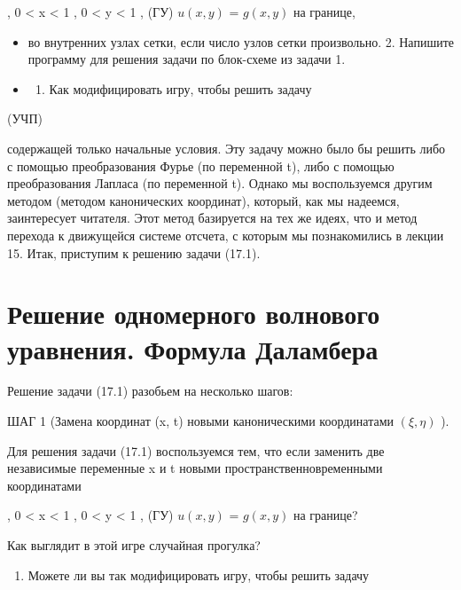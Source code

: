\documentclass[
  ukrainian,
]{article}
\providecommand{\tightlist}{%
  \setlength{\itemsep}{0pt}\setlength{\parskip}{0pt}}
\begin{document}
, 0 \textless{} x \textless{} 1 , 0 \textless{} y \textless{} 1 , (ГУ)
\(u(x, y)\) = \(g(x, y)\) на границе,

\begin{itemize}
\item
  во внутренних узлах сетки, если число узлов сетки произвольно. 2.
  Напишите программу для решения задачи по блок-схеме из задачи 1.
\item
  \begin{enumerate}
  \def\labelenumi{\arabic{enumi}.}
  \setcounter{enumi}{2}
  \tightlist
  \item
    Как модифицировать игру, чтобы решить задачу
  \end{enumerate}
\end{itemize}

(УЧП)

содержащей только начальные условия. Эту задачу можно было бы решить
либо с помощью преобразования Фурье (по переменной t), либо с помощью
преобразования Лапласа (по переменной t). Однако мы воспользуемся другим
методом (методом канонических координат), который, как мы надеемся,
заинтересует читателя. Этот метод базируется на тех же идеях, что и
метод перехода к движущейся системе отсчета, с которым мы познакомились
в лекции 15. Итак, приступим к решению задачи (17.1).

\section{Решение одномерного волнового уравнения. Формула
Даламбера}\label{ux440ux435ux448ux435ux43dux438ux435-ux43eux434ux43dux43eux43cux435ux440ux43dux43eux433ux43e-ux432ux43eux43bux43dux43eux432ux43eux433ux43e-ux443ux440ux430ux432ux43dux435ux43dux438ux44f.-ux444ux43eux440ux43cux443ux43bux430-ux434ux430ux43bux430ux43cux431ux435ux440ux430}

Решение задачи (17.1) разобьем на несколько шагов:

ШАГ 1 (Замена координат (x, t) новыми каноническими координатами
\((\xi, \eta)\) ).

Для решения задачи (17.1) воспользуемся тем, что если заменить две
независимые переменные x и t новыми пространственновременными
координатами

, 0 \textless{} x \textless{} 1 , 0 \textless{} y \textless{} 1 , (ГУ)
\(u(x, y)\) = \(g(x, y)\) на границе?

Как выглядит в этой игре случайная прогулка?

\begin{enumerate}
\def\labelenumi{\arabic{enumi}.}
\setcounter{enumi}{3}
\tightlist
\item
  Можете ли вы так модифицировать игру, чтобы решить задачу
\end{enumerate}
\end{document}
